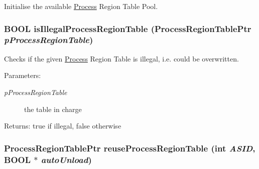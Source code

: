 Initialise the available \hyperlink{struct_process}{Process} Region Table Pool. \hypertarget{group___v_m_m___p_r_t_ga71999d60ed6ffd380de19b82064e115}{
\subsubsection[{isIllegalProcessRegionTable}]{\setlength{\rightskip}{0pt plus 5cm}BOOL isIllegalProcessRegionTable (ProcessRegionTablePtr {\em pProcessRegionTable})}}
\label{group___v_m_m___p_r_t_ga71999d60ed6ffd380de19b82064e115}


Checks if the given \hyperlink{struct_process}{Process} Region Table is illegal, i.e. could be overwritten. \begin{Desc}
\item[Parameters:]
\begin{description}
\item[{\em pProcessRegionTable}]the table in charge \end{description}
\end{Desc}
\begin{Desc}
\item[Returns:]true if illegal, false otherwise \end{Desc}
\hypertarget{group___v_m_m___p_r_t_g296088b63a558cf3d38b438dddfd4f06}{
\subsubsection[{reuseProcessRegionTable}]{\setlength{\rightskip}{0pt plus 5cm}ProcessRegionTablePtr reuseProcessRegionTable (int {\em ASID}, \/  BOOL $\ast$ {\em autoUnload})}}
\label{group___v_m_m___p_r_t_g296088b63a558cf3d38b438dddfd4f06}


